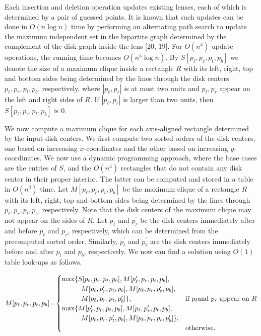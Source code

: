 \documentclass[10pt,a4paper]{amsart}
\begin{document}
\par
\par
Each insertion and deletion operation updates existing lenses, each of which is determined by a pair of guessed points. It is known that such updates can be done in $O(n\log n)$ time by performing an alternating path search to update the maximum independent set in the bipartite graph determined by the complement of the disk graph inside the lens [20, 19]. For $O(n^{4})$ update operations, the running time becomes $O(n^{5}\log n)$. By $S[p_{\ell},p_{r},p_{t},p_{b}]$ we denote the size of a maximum clique inside a rectangle $R$ with its left, right, top and bottom sides being determined by the lines through the disk centers $p_{\ell},p_{r},p_{t},p_{b}$, respectively, where $|p_{\ell},p_{r}|$ is at most two units and $p_{\ell},p_{r}$ appear on the left and right sides of $R$. If $|p_{\ell},p_{r}|$ is larger than two units, then $S[p_{\ell},p_{r},p_{t},p_{b}]$ is 0.
\par
\par
We now compute a maximum clique for each axis-aligned rectangle determined by the input disk centers. We first compute two sorted orders of the disk centers, one based on increasing $x$-coordinates and the other based on increasing $y$-coordinates. We now use a dynamic programming approach, where the base cases are the entries of $S$, and the $O(n^{4})$ rectangles that do not contain any disk center in their proper interior. The latter can be computed and stored in a table in $O(n^{4})$ time. Let $M[p_{\ell},p_{r},p_{t},p_{b}]$ be the maximum clique of a rectangle $R$ with its left, right, top and bottom sides being determined by the lines through $p_{\ell},p_{r},p_{t},p_{b}$, respectively. Note that the disk centers of the maximum clique may not appear on the sides of $R$. Let $p^{\prime}_{\ell}$ and $p^{\prime}_{r}$ be the disk centers immediately after and before $p_{\ell}$ and $p_{r}$, respectively, which can be determined from the precomputed sorted order. Similarly, $p^{\prime}_{t}$ and $p^{\prime}_{b}$ are the disk centers immediately before and after $p_{t}$ and $p_{b}$, respectively. We now can find a solution using $O(1)$ table look-ups as follows.
\par
\[\begin{aligned}
\displaystyle M[p_{\ell},p_{r},p_{t},p_{b}]{=}\begin{cases}\max\{S[p_{\ell},p_%
{r},p_{t},p_{b}],M[p^{\prime}_{\ell},p_{r},p_{t},p_{b}],\\
\hskip 28.45274ptM[p_{\ell},p^{\prime}_{r},p_{t},p_{b}],M[p_{\ell},p_{r},p^{%
\prime}_{t},p_{b}],\\
\hskip 28.45274ptM[p_{\ell},p_{r},p_{t},p^{\prime}_{b}]\},&\text{if $p_{\ell}$%
 and $p_{r}$ appear on $R$}\\
\max\{M[p^{\prime}_{\ell},p_{r},p_{t},p_{b}],M[p_{\ell},p^{\prime}_{r},p_{t},p%
_{b}],\\
\hskip 28.45274ptM[p_{\ell},p_{r},p^{\prime}_{t},p_{b}],M[p_{\ell},p_{r},p_{t}%
,p^{\prime}_{b}]\},\\
&\text{otherwise.}\\
\end{cases}
\end{aligned}\]
\end{document}
